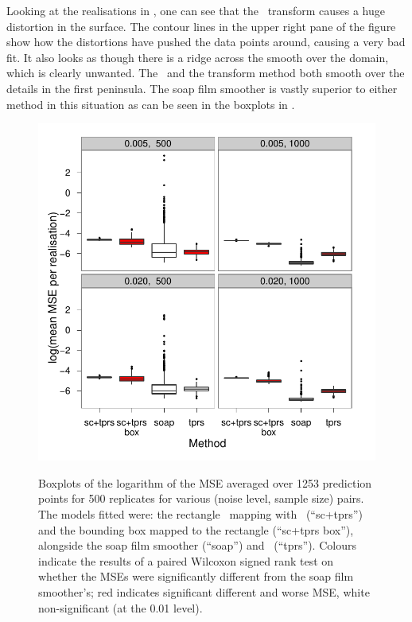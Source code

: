 Looking at the realisations in , one can see that the \sch\ transform causes a huge distortion in the surface. The contour lines in the upper right pane of the figure show how the distortions have pushed the data points around, causing a very bad fit. It also looks as though there is a ridge across the smooth over the domain, which is clearly unwanted. The \tprs\ and the transform method both smooth over the details in the first peninsula. The soap film smoother is vastly superior to either method in this situation as can be seen in the boxplots in .

\begin{figure}[t]
\centering
\includegraphics[width=\textwidth]{sc/tablecode/wt2-boxplot.pdf} \\
\caption{Boxplots of the logarithm of the MSE averaged over 1253 prediction points for 500 replicates for various (noise level, sample size) pairs. The models fitted were: the rectangle \sch\ mapping with \tprss\ (``sc+tprs'') and the bounding box mapped to the rectangle (``sc+tprs box''), alongside the soap film smoother (``soap'') and \tprs\ (``tprs''). Colours indicate the results of a paired Wilcoxon signed rank test on whether the MSEs were significantly different from the soap film smoother's; red indicates significant different and worse MSE, white non-significant (at the 0.01 level).}
\label{wigglytop2-boxplots}
\end{figure}

